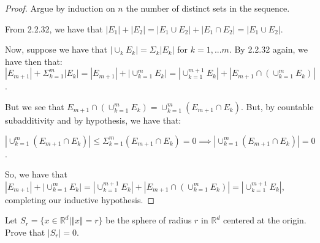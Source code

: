 \documentclass[10pt]{article}
\newenvironment{problem}[2][Problem]{\begin{trivlist}
\item[\hskip \labelsep {\bfseries #1}\hskip \labelsep {\bfseries #2.}]}{\end{trivlist}}
\begin{document}
\begin{proof}[Proof]

Argue by induction on $n$ the number of distinct sets in the sequence.

From 2.2.32, we have that $|E_1| + |E_2| = |E_1 \cup E_2 | + | E_1 \cap E_2 | =  |E_1 \cup E_2 |$.

Now, suppose we have that $ |\cup_k E_k | = \Sigma_k|E_k| $ for $ k = 1,...m$. By 2.2.32 again, we have then that: $|E_{m+1}| + \Sigma_{k=1}^m |E_k| = |E_{m+1}| + |\cup_{k=1}^{m} E_k| = |\cup_{k=1}^{m+1} E_k | + | E_{m+1} \cap (\cup_{k=1}^{m} E_k)|$.

But we see that $E_{m+1} \cap (\cup_{k=1}^{m} E_k) = \cup_{k=1}^m (E_{m+1} \cap E_k)$. But, by countable subadditivity and by hypothesis, we have that:

$$|\cup_{k=1}^m (E_{m+1} \cap E_k)| \leq \Sigma_{k=1}^m (E_{m+1} \cap E_k) = 0 \implies |\cup_{k=1}^m (E_{m+1} \cap E_k)| = 0$$.

So, we have that $|E_{m+1}| + |\cup_{k=1}^{m} E_k| = |\cup_{k=1}^{m+1} E_k | + | E_{m+1} \cap (\cup_{k=1}^{m} E_k)| = |\cup_{k=1}^{m+1} E_k | $, completing our inductive hypothesis.

\end{proof}

\begin{problem}{2.2.34}
Let $S_r = \{ x \in \mathbb{R}^d | \Vert x \Vert = r \}$ be the sphere of radius $r$ in $\mathbb{R}^d$ centered at the origin. Prove that $|S_r|  = 0$.
\end{problem}
\end{document}
